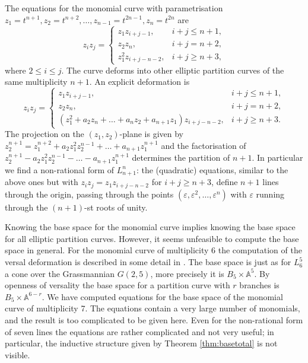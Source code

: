 \documentclass[12pt,a4paper]{amsart}  %
\newcommand{\A}{\mathbb{A}}
\newcommand{\ep}{\varepsilon}
\theoremstyle{definition}
\theoremstyle{remark}
\begin{document}
\subsection{}
The equations for  the monomial curve with parametrisation
 $z_1=t^{n+1},z_2=t^{n+2}, \dots,z_{n-1}=t^{2n-1},z_n=t^{2n}$
 are 
 \[
 z_i z_j =
 \begin{cases}
 z_1 z_{i+j-1}, &i+j \leq n+1,\\
 z_2 z_{n}, &i+j =n+2,\\
  z_1^2 z_{i+j-n-2} ,&i+ j\geq n+3,
\end{cases}
\]
where $2\leq i \leq j$.
The curve deforms into  other elliptic partition curves of the same 
multiplicity $n+1$. An explicit deformation  is 
\[
 z_i z_j =
 \begin{cases}
 z_1 z_{i+j-1}, &i+j \leq n+1,\\
 z_2 z_{n}, &i+j =n+2,\\
  (z_1^2+a_2 z_n+\dots+a_n z_2 +a_{n+1}z_1) z_{i+j-n-2} ,&i+ j\geq n+3.
\end{cases}
\]
The projection on the $(z_1,z_2)$-plane is given by
$z_2^{n+1}=z_1^{n+2}+a_2z_1^2z_2^{n-1}+\dots+a_{n+1}z_1^{n+1}$
and the factorisation of 
$z_2^{n+1}-a_2z_1^2z_2^{n-1}-\dots-a_{n+1}z_1^{n+1}$ determines the partition of $n+1$.  In particular we find  a non-rational form of $L_{n+1}^n$: 
the (quadratic)  equations, similar to the above ones but with   $z_i z_j =
  z_1 z_{i+j-n-2}$ for $i+j\geq n+3$, 
define $n+1$ lines through the origin, passing through the points
$(\ep,\ep^2,\dots,\ep^n)$ with $\ep$ running through the $(n+1)$-st roots
of unity. 

Knowing the base space for the monomial 	curve implies knowing
the base space for all elliptic partition curves. However, it seems
unfeasible to compute the base space in general.
For the monomial curve of multiplicity 6 the computation of the versal deformation
is described in some detail in \cite{CS}. The base space is just as for $L^5_6$ a cone
 over the Grassmannian $G(2, 5)$, more precisely it is $B_5\times \A^5$. 
 By openness of versality the base space for a partition curve with $r$ branches
 is $B_5\times \A^{6-r}$.  
 We have computed  equations for the base space of the monomial curve of multiplicity 7. The  equations contain a very large number of monomials, and the result is too complicated to be given here. Even for the non-rational form of  seven lines
the equations are rather complicated and not very useful; in particular, the
inductive structure given by Theorem \ref{thm:basetotal} is not visible.
\end{document}
